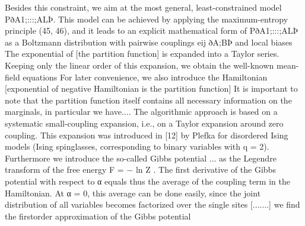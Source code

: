 	Besides this constraint, we aim at the most general, least-constrained model PðA1;:::;ALÞ. This model can be achieved by applying the maximum-entropy principle (45, 46), and it leads to an explicit mathematical form of PðA1;:::;ALÞ as a Boltzmann distribution with pairwise couplings eij ðA;BÞ and local biases \cite{morcos2011direct}
	 The exponential of [the partition function] is expanded into a Taylor series. Keeping only the linear order of this expansion, we obtain the well-known mean-field equations \cite{morcos2011direct}
	For later convenience, we also introduce the Hamiltonian [exponential of negative Hamiltonian is the partition function] \cite{morcos2011direct}
	It is important to note that the partition function itself contains all necessary information on the marginals, in particular we have.... \cite{morcos2011direct}
	The algorithmic approach is based on a systematic small-coupling expansion, i.e., on a Taylor expansion around zero coupling. This expansion was introduced in [12] by Plefka for disordered Ising models (Ising spinglasses, corresponding to binary variables with q = 2). \cite{morcos2011direct}
	Furthermore we introduce the so-called Gibbs potential ... as the Legendre transform of the free energy F = − ln Z . \cite{morcos2011direct}
	The first derivative of the Gibbs potential with respect to α equals thus the average of the coupling term in the Hamiltonian. At α = 0, this average can be done easily, since the joint distribution of all variables becomes factorized over the single sites [.......] we find the firstorder approximation of the Gibbs potential \cite{morcos2011direct}


